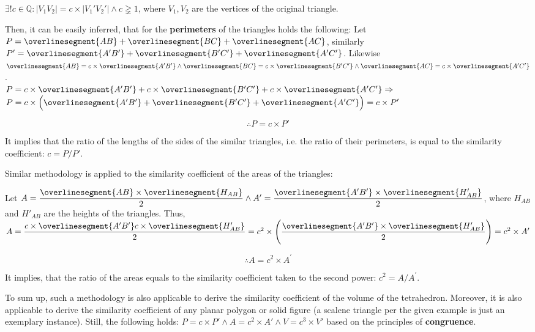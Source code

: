 \documentclass[10pt,a4paper]{article}
\begin{document}
$\exists! c \in \mathbb{Q}: |V_1 V_2| = c \times |V_1' V_2'| \land c \gneqq 1$, where $V_1, V_2$ 
are the vertices of the original triangle.

Then, it can be easily inferred, that for the \textbf{perimeters} of the triangles
holds the following: Let $P = \overlinesegment{AB} + \overlinesegment{BC} + \overlinesegment{AC}$, similarly 
$P' = \overlinesegment{A'B'} + \overlinesegment{B'C'} + \overlinesegment{A'C'}$. Likewise
$
\overlinesegment{AB} = c \times \overlinesegment{A'B'} \land 
\overlinesegment{BC} = c \times \overlinesegment{B'C'} \land
\overlinesegment{AC} = c \times \overlinesegment{A'C'}
$. \\

$P = c \times \overlinesegment{A'B'} + c \times \overlinesegment{B'C'} + c 
\times \overlinesegment{A'C'} \Rightarrow$
$P = c \times \Big( \overlinesegment{A'B'} + \overlinesegment{B'C'} + \overlinesegment{A'C'} \Big) = c \times P'$

$$\therefore P = c \times P'$$

It implies that the ratio of the lengths of the sides of the similar triangles,
i.e. the ratio of their perimeters, is equal to the similarity coefficient:
$c = {P}/{P'}$.

Similar methodology is applied to the similarity coefficient of the areas of the triangles:

Let $A = \dfrac{\overlinesegment{AB} \times \overlinesegment{H_{AB}}}{2} \land 
A' = \dfrac{\overlinesegment{A'B'} \times \overlinesegment{H'_{AB}}}{2}$,
where $H_{AB}$ and $H'_{AB}$ are the heights of the triangles. Thus,
$A = \dfrac{c \times \overlinesegment{A'B'} c \times \overlinesegment{H'_{AB}}}{2} = 
c^2 \times \Bigg( \dfrac{\overlinesegment{A'B'} 
\times \overlinesegment{H'_{AB}}}{2} \Bigg) = c^2 \times A'$

$$\therefore A = c^2 \times A^{\prime}$$

It implies, that the ratio of the areas equals to the similarity coefficient
taken to the second power: $c^2 = {A}/{A^{\prime}}$.

To sum up, such a methodology is also applicable to derive the similarity coefficient 
of the volume of the tetrahedron. Moreover, it is also applicable to derive the similarity coefficient
of any planar polygon or solid figure (a scalene triangle per the given example is just an exemplary instance). 
Still, the following holds: $P = c \times P' \land A = c^2 \times A' \land V = c^3 \times V'$ 
based on the principles of \textbf{congruence}.
\end{document}

